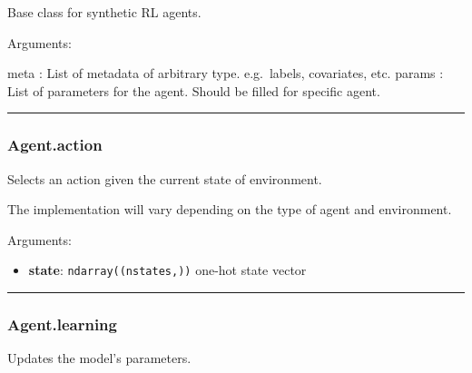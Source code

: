 Base class for synthetic RL agents.

Arguments:

meta : List of metadata of arbitrary type. e.g.~labels, covariates, etc.
params : List of parameters for the agent. Should be filled for specific
agent.

\begin{center}\rule{0.5\linewidth}{\linethickness}\end{center}

\hypertarget{agent.action}{%
\subsubsection{Agent.action}\label{agent.action}}

\begin{Shaded}
\begin{Highlighting}[]
\end{Highlighting}
\end{Shaded}

Selects an action given the current state of environment.

The implementation will vary depending on the type of agent and
environment.

Arguments:

\begin{itemize}
\tightlist
\item
  \textbf{state}: \texttt{ndarray((nstates,))} one-hot state vector
\end{itemize}

\begin{center}\rule{0.5\linewidth}{\linethickness}\end{center}

\hypertarget{agent.learning}{%
\subsubsection{Agent.learning}\label{agent.learning}}

\begin{Shaded}
\begin{Highlighting}[]
\end{Highlighting}
\end{Shaded}

Updates the model's parameters.

